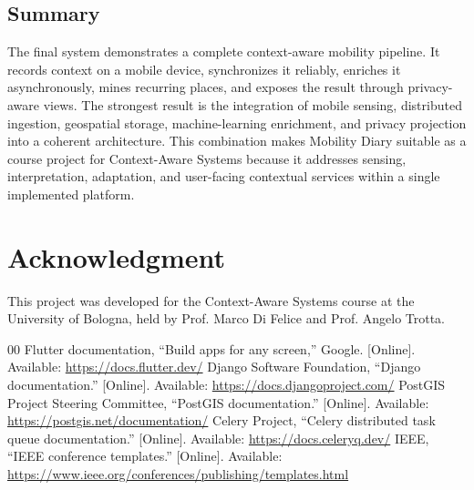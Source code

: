 \documentclass[conference,a4paper]{IEEEtran}
\begin{document}
\subsection{Summary}

The final system demonstrates a complete context-aware mobility pipeline. It records context on a mobile device, synchronizes it reliably, enriches it asynchronously, mines recurring places, and exposes the result through privacy-aware views. The strongest result is the integration of mobile sensing, distributed ingestion, geospatial storage, machine-learning enrichment, and privacy projection into a coherent architecture. This combination makes Mobility Diary suitable as a course project for Context-Aware Systems because it addresses sensing, interpretation, adaptation, and user-facing contextual services within a single implemented platform.

\section*{Acknowledgment}

This project was developed for the Context-Aware Systems course at the University of Bologna, held by Prof. Marco Di Felice and Prof. Angelo Trotta.

\begin{thebibliography}{00}
 Flutter documentation, ``Build apps for any screen,'' Google. [Online]. Available: \url{https://docs.flutter.dev/}
 Django Software Foundation, ``Django documentation.'' [Online]. Available: \url{https://docs.djangoproject.com/}
 PostGIS Project Steering Committee, ``PostGIS documentation.'' [Online]. Available: \url{https://postgis.net/documentation/}
 Celery Project, ``Celery distributed task queue documentation.'' [Online]. Available: \url{https://docs.celeryq.dev/}
 IEEE, ``IEEE conference templates.'' [Online]. Available: \url{https://www.ieee.org/conferences/publishing/templates.html}
\end{thebibliography}
\end{document}
